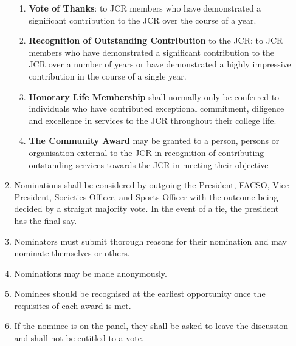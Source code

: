 \begin{enumerate}
\begin{enumerate}
        \begin{enumerate}
            \item \textbf{Vote of Thanks}: to JCR members who have demonstrated a significant contribution
            to the JCR over the course of a year.
            \item \textbf{Recognition of Outstanding Contribution} to the JCR: to JCR members who have
            demonstrated a significant contribution to the JCR over a number of years or have
            demonstrated a highly impressive contribution in the course of a single year.
            \item \textbf{Honorary Life Membership} shall normally only be conferred to individuals who have
            contributed exceptional commitment, diligence and excellence in services to the JCR
            throughout their college life.
            \item \textbf{The Community Award} may be granted to a person, persons or organisation external
            to the JCR in recognition of contributing outstanding services towards the JCR in
            meeting their objective
        \end{enumerate}
       \item Nominations shall be considered by outgoing the President, FACSO, Vice-President, Societies Officer, and Sports Officer with the outcome being decided by a straight majority vote. In the event of a tie, the president has the final say.
        \item Nominators must submit thorough reasons for their nomination and may nominate themselves or others. 
        \item Nominations may be made anonymously.
        \item Nominees should be recognised at the earliest opportunity once the requisites of each award is met.
        \item If the nominee is on the panel, they shall be asked to leave the discussion and shall not be entitled to a vote.

    \end{enumerate}
\end{enumerate}

